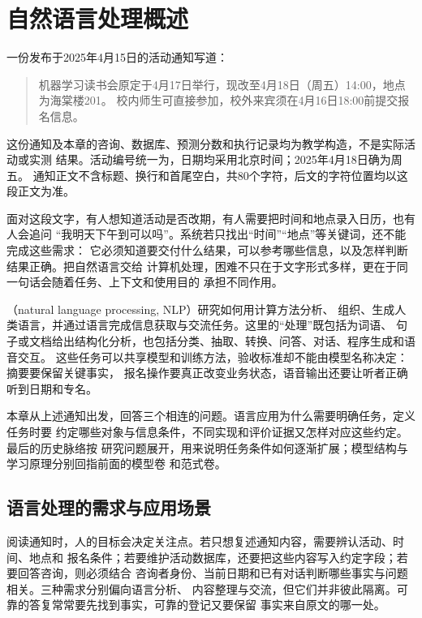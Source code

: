 \chapter{自然语言处理概述}
\label{chap:nlp-introduction}

一份发布于2025年4月15日的活动通知写道：

\begin{quote}
机器学习读书会原定于4月17日举行，现改至4月18日（周五）14:00，地点为海棠楼201。
校内师生可直接参加，校外来宾须在4月16日18:00前提交报名信息。
\end{quote}

这份通知及本章的咨询、数据库、预测分数和执行记录均为教学构造，不是实际活动或实测
结果。活动编号统一为，日期均采用北京时间；2025年4月18日确为周五。
通知正文不含标题、换行和首尾空白，共80个字符，后文的字符位置均以这段正文为准。

面对这段文字，有人想知道活动是否改期，有人需要把时间和地点录入日历，也有人会追问
“我明天下午到可以吗”。系统若只找出“时间”“地点”等关键词，还不能完成这些需求：
它必须知道要交付什么结果，可以参考哪些信息，以及怎样判断结果正确。把自然语言交给
计算机处理，困难不只在于文字形式多样，更在于同一句话会随着任务、上下文和使用目的
承担不同作用。

（natural language processing, NLP）研究如何用计算方法分析、
组织、生成人类语言，并通过语言完成信息获取与交流任务。这里的“处理”既包括为词语、
句子或文档给出结构化分析，也包括分类、抽取、转换、问答、对话、程序生成和语音交互。
这些任务可以共享模型和训练方法，验收标准却不能由模型名称决定：摘要要保留关键事实，
报名操作要真正改变业务状态，语音输出还要让听者正确听到日期和专名。

本章从上述通知出发，回答三个相连的问题。语言应用为什么需要明确任务，定义任务时要
约定哪些对象与信息条件，不同实现和评价证据又怎样对应这些约定。最后的历史脉络按
研究问题展开，用来说明任务条件如何逐渐扩展；模型结构与学习原理分别回指前面的模型卷
和范式卷。

\section{语言处理的需求与应用场景}
\label{sec:nlp-needs-and-scenarios}

阅读通知时，人的目标会决定关注点。若只想复述通知内容，需要辨认活动、时间、地点和
报名条件；若要维护活动数据库，还要把这些内容写入约定字段；若要回答咨询，则必须结合
咨询者身份、当前日期和已有对话判断哪些事实与问题相关。三种需求分别偏向语言分析、
内容整理与交流，但它们并非彼此隔离。可靠的答复常常要先找到事实，可靠的登记又要保留
事实来自原文的哪一处。

